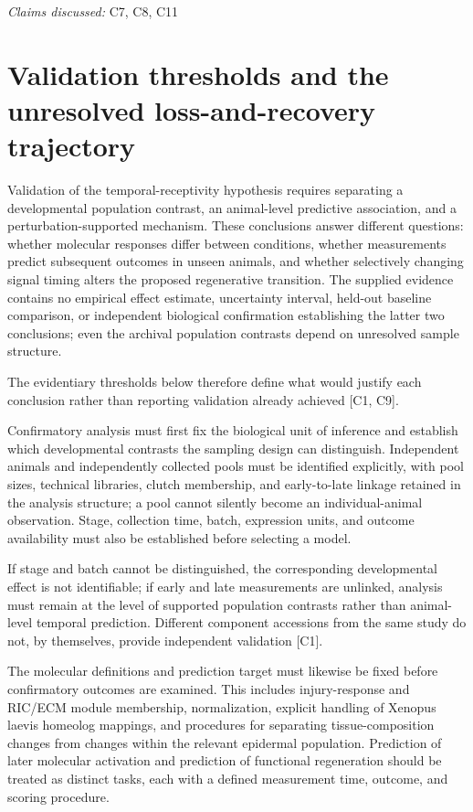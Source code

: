 \documentclass[11pt]{article}
\begin{document}
\textit{Claims discussed: }C7, C8, C11
\section{Validation thresholds and the unresolved loss-and-recovery trajectory}
Validation of the temporal-receptivity hypothesis requires separating a developmental population contrast, an animal-level predictive association, and a perturbation-supported mechanism. These conclusions answer different questions: whether molecular responses differ between conditions, whether measurements predict subsequent outcomes in unseen animals, and whether selectively changing signal timing alters the proposed regenerative transition. The supplied evidence contains no empirical effect estimate, uncertainty interval, held-out baseline comparison, or independent biological confirmation establishing the latter two conclusions; even the archival population contrasts depend on unresolved sample structure.

The evidentiary thresholds below therefore define what would justify each conclusion rather than reporting validation already achieved [C1, C9].

Confirmatory analysis must first fix the biological unit of inference and establish which developmental contrasts the sampling design can distinguish. Independent animals and independently collected pools must be identified explicitly, with pool sizes, technical libraries, clutch membership, and early-to-late linkage retained in the analysis structure; a pool cannot silently become an individual-animal observation. Stage, collection time, batch, expression units, and outcome availability must also be established before selecting a model.

If stage and batch cannot be distinguished, the corresponding developmental effect is not identifiable; if early and late measurements are unlinked, analysis must remain at the level of supported population contrasts rather than animal-level temporal prediction. Different component accessions from the same study do not, by themselves, provide independent validation [C1].

The molecular definitions and prediction target must likewise be fixed before confirmatory outcomes are examined. This includes injury-response and RIC/ECM module membership, normalization, explicit handling of Xenopus laevis homeolog mappings, and procedures for separating tissue-composition changes from changes within the relevant epidermal population. Prediction of later molecular activation and prediction of functional regeneration should be treated as distinct tasks, each with a defined measurement time, outcome, and scoring procedure.
\end{document}
